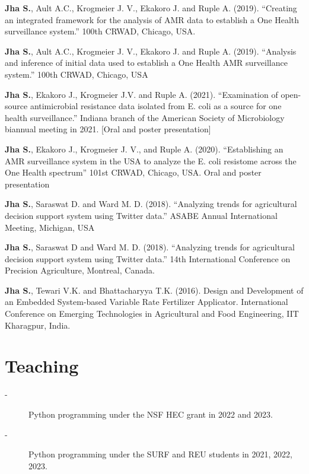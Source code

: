 \documentclass[10pt]{article}
\begin{document}
\begin{description}
\item	\textbf{Jha S.}, Ault A.C., Krogmeier J. V., Ekakoro J. and Ruple A. (2019). “Creating an integrated framework for the analysis of AMR data to establish a One Health surveillance system.” 100th CRWAD, Chicago, USA.
\item	\textbf{Jha S.}, Ault A.C., Krogmeier J. V., Ekakoro J. and Ruple A. (2019). “Analysis and inference of initial data used to establish a One Health AMR surveillance system.” 100th CRWAD, Chicago, USA
\item	\textbf{Jha S.}, Ekakoro J., Krogmeier J.V. and Ruple A. (2021). “Examination of open-source antimicrobial resistance data isolated from E. coli as a source for one health surveillance.” Indiana branch of the American Society of Microbiology biannual meeting in 2021. [Oral and poster presentation]
\item	\textbf{Jha S.}, Ekakoro J., Krogmeier J. V., and Ruple A. (2020). “Establishing an AMR surveillance system in the USA to analyze the E. coli resistome across the One Health spectrum” 101st CRWAD, Chicago, USA. Oral and poster presentation
\item	\textbf{Jha S.}, Saraswat D. and Ward M. D. (2018). “Analyzing trends for agricultural decision support system using Twitter data.” ASABE Annual International Meeting, Michigan, USA
\item	\textbf{Jha S.}, Saraswat D and Ward M. D. (2018). “Analyzing trends for agricultural decision support system using Twitter data.” 14th International Conference on Precision Agriculture, Montreal, Canada.
\item \textbf{Jha S.}, Tewari V.K. and Bhattacharyya T.K. (2016). Design and Development of an Embedded System-based Variable Rate Fertilizer Applicator. International Conference on Emerging Technologies in Agricultural and Food Engineering, IIT Kharagpur, India.
\end{description}


\section{Teaching}
\begin{description}
    \item[-] Python programming under the NSF HEC grant in 2022 and 2023.
    \item[-] Python programming under the SURF and REU students in 2021, 2022, 2023.
\end{description}
\end{document}
